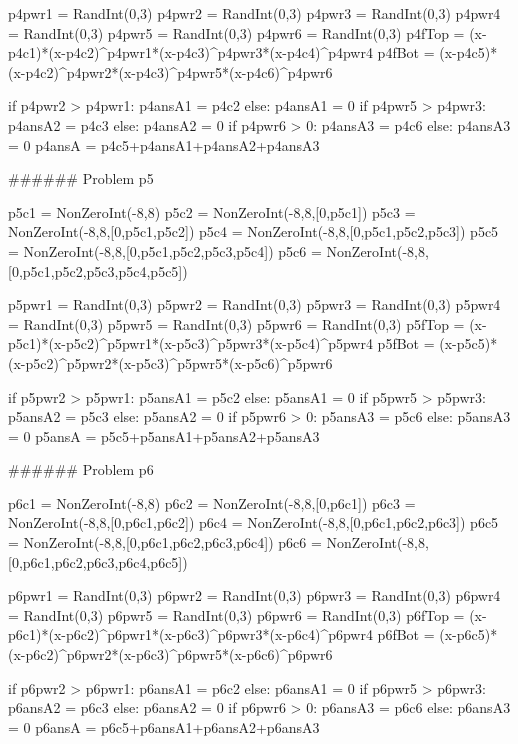 \documentclass{ximera}
\begin{document}
\begin{sagesilent}
p4pwr1 = RandInt(0,3)
p4pwr2 = RandInt(0,3)
p4pwr3 = RandInt(0,3)
p4pwr4 = RandInt(0,3)
p4pwr5 = RandInt(0,3)
p4pwr6 = RandInt(0,3)
p4fTop = (x-p4c1)*(x-p4c2)^p4pwr1*(x-p4c3)^p4pwr3*(x-p4c4)^p4pwr4
p4fBot = (x-p4c5)*(x-p4c2)^p4pwr2*(x-p4c3)^p4pwr5*(x-p4c6)^p4pwr6

if p4pwr2 > p4pwr1:
    p4ansA1 = p4c2
else:
    p4ansA1 = 0
if p4pwr5 > p4pwr3:
    p4ansA2 = p4c3
else:
    p4ansA2 = 0
if p4pwr6 > 0:
    p4ansA3 = p4c6
else:
    p4ansA3 = 0
p4ansA = p4c5+p4ansA1+p4ansA2+p4ansA3



###### Problem p5

p5c1 = NonZeroInt(-8,8)
p5c2 = NonZeroInt(-8,8,[0,p5c1])
p5c3 = NonZeroInt(-8,8,[0,p5c1,p5c2])
p5c4 = NonZeroInt(-8,8,[0,p5c1,p5c2,p5c3])
p5c5 = NonZeroInt(-8,8,[0,p5c1,p5c2,p5c3,p5c4])
p5c6 = NonZeroInt(-8,8,[0,p5c1,p5c2,p5c3,p5c4,p5c5])

p5pwr1 = RandInt(0,3)
p5pwr2 = RandInt(0,3)
p5pwr3 = RandInt(0,3)
p5pwr4 = RandInt(0,3)
p5pwr5 = RandInt(0,3)
p5pwr6 = RandInt(0,3)
p5fTop = (x-p5c1)*(x-p5c2)^p5pwr1*(x-p5c3)^p5pwr3*(x-p5c4)^p5pwr4
p5fBot = (x-p5c5)*(x-p5c2)^p5pwr2*(x-p5c3)^p5pwr5*(x-p5c6)^p5pwr6

if p5pwr2 > p5pwr1:
    p5ansA1 = p5c2
else:
    p5ansA1 = 0
if p5pwr5 > p5pwr3:
    p5ansA2 = p5c3
else:
    p5ansA2 = 0
if p5pwr6 > 0:
    p5ansA3 = p5c6
else:
    p5ansA3 = 0
p5ansA = p5c5+p5ansA1+p5ansA2+p5ansA3



###### Problem p6

p6c1 = NonZeroInt(-8,8)
p6c2 = NonZeroInt(-8,8,[0,p6c1])
p6c3 = NonZeroInt(-8,8,[0,p6c1,p6c2])
p6c4 = NonZeroInt(-8,8,[0,p6c1,p6c2,p6c3])
p6c5 = NonZeroInt(-8,8,[0,p6c1,p6c2,p6c3,p6c4])
p6c6 = NonZeroInt(-8,8,[0,p6c1,p6c2,p6c3,p6c4,p6c5])

p6pwr1 = RandInt(0,3)
p6pwr2 = RandInt(0,3)
p6pwr3 = RandInt(0,3)
p6pwr4 = RandInt(0,3)
p6pwr5 = RandInt(0,3)
p6pwr6 = RandInt(0,3)
p6fTop = (x-p6c1)*(x-p6c2)^p6pwr1*(x-p6c3)^p6pwr3*(x-p6c4)^p6pwr4
p6fBot = (x-p6c5)*(x-p6c2)^p6pwr2*(x-p6c3)^p6pwr5*(x-p6c6)^p6pwr6

if p6pwr2 > p6pwr1:
    p6ansA1 = p6c2
else:
    p6ansA1 = 0
if p6pwr5 > p6pwr3:
    p6ansA2 = p6c3
else:
    p6ansA2 = 0
if p6pwr6 > 0:
    p6ansA3 = p6c6
else:
    p6ansA3 = 0
p6ansA = p6c5+p6ansA1+p6ansA2+p6ansA3



\end{sagesilent}
\end{document}

